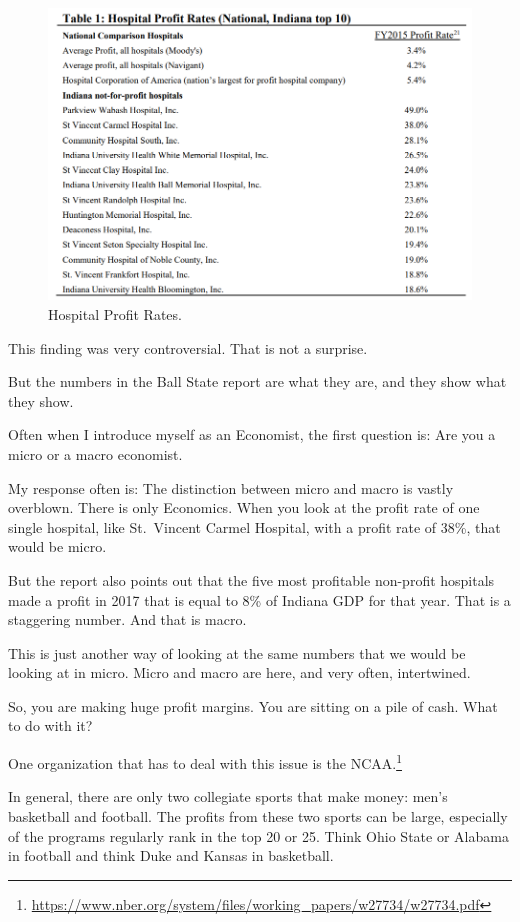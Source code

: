 \documentclass[
]{book}
\begin{document}
\begin{figure}

{\centering \includegraphics[width=0.75\linewidth]{img/ch6/fig4} 

}

\caption{Hospital Profit Rates.}\label{fig:fig604}
\end{figure}

This finding was very controversial. That is not a surprise.

But the numbers in the Ball State report are what they are, and they show what they show.

Often when I introduce myself as an Economist, the first question is: Are you a micro or a macro economist.

My response often is: The distinction between micro and macro is vastly overblown. There is only Economics.
When you look at the profit rate of one single hospital, like St.~Vincent Carmel Hospital, with a profit rate of 38\%, that would be micro.

But the report also points out that the five most profitable non-profit hospitals made a profit in 2017 that is equal to 8\% of Indiana GDP for that year. That is a staggering number. And that is macro.

This is just another way of looking at the same numbers that we would be looking at in micro. Micro and macro are here, and very often, intertwined.

So, you are making huge profit margins. You are sitting on a pile of cash. What to do with it?

One organization that has to deal with this issue is the NCAA.\footnote{\url{https://www.nber.org/system/files/working_papers/w27734/w27734.pdf}}

In general, there are only two collegiate sports that make money: men's basketball and football. The profits from these two sports can be large, especially of the programs regularly rank in the top 20 or 25. Think Ohio State or Alabama in football and think Duke and Kansas in basketball.
\end{document}
